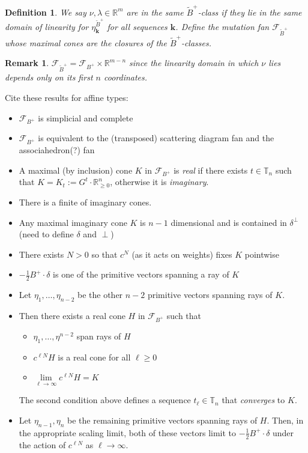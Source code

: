 \documentclass{amsart}
\newtheorem{definition}[theorem]{Definition}
\newtheorem{remark}[theorem]{Remark}
\numberwithin{theorem}{section}
\newcommand{\bfk}{{\boldsymbol{k}}}
\newcommand{\cF}{\mathcal{F}}
\newcommand{\RR}{\mathbb{R}}
\newcommand{\TT}{\mathbb{T}}
\begin{document}
  \begin{definition}
    We say $\nu,\lambda\in\RR^m$ are in the same \emph{$\widetilde B^+$-class} if they lie in the same domain of linearity for $\eta^{\widetilde B^+}_\bfk$ for all sequences $\bfk$.
    Define the \emph{mutation fan} $\cF_{\widetilde B^+}$ whose maximal cones are the closures of the $\widetilde B^+$-classes.
  \end{definition}
  \begin{remark}
    $\cF_{\widetilde B^+}=\cF_{B^+}\times \RR^{m-n}$ since the linearity domain in which $\nu$ lies depends only on its first $n$ coordinates.
  \end{remark}

  Cite these results for affine types:
  \begin{itemize}
    \item $\cF_{B^+}$ is simplicial and complete 
    \item $\cF_{B^+}$ is equivalent to the (transposed) scattering diagram fan and the associahedron(?) fan
    \item A maximal (by inclusion) cone $K$ in $\cF_{B^+}$ is \emph{real} if there exists $t\in\TT_n$ such that $K=K_t:=G^t\cdot\RR^n_{\ge0}$, otherwise it is \emph{imaginary}.
    \item There is a finite of imaginary cones.
    \item Any maximal imaginary cone $K$ is $n-1$ dimensional and is contained in $\delta^\perp$ (need to define $\delta$ and $\perp$)
    \item There exists $N>0$ so that $c^N$ (as it acts on weights) fixes $K$ pointwise
    \item $-\frac12 B^+\cdot\delta$ is one of the primitive vectors spanning a ray of $K$
    \item Let $\eta_1,\ldots,\eta_{n-2}$ be the other $n-2$ primitive vectors spanning rays of $K$.  
    \item Then there exists a real cone $H$ in $\cF_{B^+}$ such that
      \begin{itemize}
        \item $\eta_1,\ldots,\eta^{n-2}$ span rays of $H$
        \item $c^{\ell N} H$ is a real cone for all $\ell\ge0$
        \item $\lim\limits_{\ell\to\infty} c^{\ell N} H = K$
      \end{itemize}
      The second condition above defines a sequence $t_\ell\in\TT_n$ that \emph{converges} to $K$.
    \item Let $\eta_{n-1},\eta_n$ be the remaining primitive vectors spanning rays of $H$.  Then, in the appropriate scaling limit, both of these vectors limit to $-\frac12 B^+\cdot\delta$ under the action of $c^{\ell N}$ as $\ell\to\infty$.
  \end{itemize}
\end{document}
